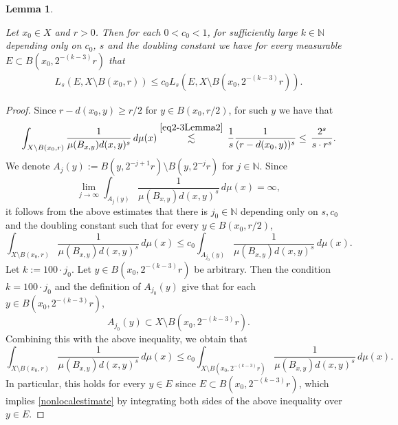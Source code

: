 \documentclass[11pt,leqno]{amsart}
\newtheorem{lemma}[theorem]{Lemma}
\numberwithin{equation}{section}
\theoremstyle{definition}
\begin{document}
	\begin{lemma}\label{nonlocal}
		
		
		Let 
		$x_0\in X$ and $r>0$.
		Then for each $0<c_0<1$, for sufficiently large $k\in\mathbb N$
		depending only on $c_0$, $s$ and the doubling constant we have for every measurable
		$E\subset B(x_0, 2^{-(k-3)}r)$ that
		\begin{align}\label{nonlocalestimate}
			L_{s}(E, X\setminus B(x_0,r))\leq c_0 L_s(E, X\setminus B(x_0,2^{-(k-3)}r)).
		\end{align}
	\end{lemma}
	\begin{proof}
		Since  $r-d(x_0,y)\geq r/2$ for $y\in B(x_0,r/2)$, for such $y$ we have that
		\begin{align*}
			\int_{X\setminus B(x_0,r)} \frac{1}{\mu(B_{x,y})d(x,y)^s}\,d\mu(x)
			\overset{\eqref{eq2-3Lemma2}}{\lesssim}\,  \frac{1}{s} \frac{1}{(r-d(x_0,y))^s}  
			\leq \,  \frac{2^s}{s\cdot r^s}.
		\end{align*}
		We denote $A_j(y):=B(y,2^{-j+1}r)\setminus B(y,2^{-j} r)$ for $j\in \mathbb N$. Since
		\[
		\lim_{j\to \infty}\int_{A_j(y)} \frac{1}{\mu(B_{x,y})d(x,y)^s}\,d\mu(x)=\infty,
		\]
		it follows from the above estimates that there is  $j_0\in\mathbb N$ depending only  on $s,c_0$ and the doubling constant such that for every $y\in B(x_0,r/2)$,
		\[
		\int_{X\setminus B(x_0,r)} \frac{1}{\mu(B_{x,y})d(x,y)^s}\,d\mu(x)
		\le c_0\int_{A_{j_0}(y)}\frac{1}{\mu(B_{x,y})d(x,y)^s}\,d\mu(x).
		\]
		Let $k:=100\cdot j_0$. Let $y\in B(x_0, 2^{-(k-3)}r)$ be arbitrary.
		Then the condition $k=100\cdot j_0$ and the definition of $A_{j_0}(y)$ give that for each  $y\in B(x_0,2^{-(k-3)}r)$,
		\[
		A_{j_0}(y)\subset X\setminus B(x_0, 2^{-(k-3)}r).
		\]
		Combining this with the above inequality, we obtain that 
		\[
		\int_{X\setminus B(x_0,r)} \frac{1} {\mu(B_{x,y})d(x,y)^s}\,d\mu(x)
		\leq c_0 \int_{X\setminus B(x_0, 2^{-(k-3)}r)} \frac{1}{\mu(B_{x,y})d(x,y)^s}\,d\mu(x).
		\]
		In particular, this holds for every $y\in E$ since $E\subset B(x_0, 2^{-(k-3)}r)$, which implies  \eqref{nonlocalestimate} by integrating both sides of the above inequality over $y\in E$.
	\end{proof}
	
\end{document}
